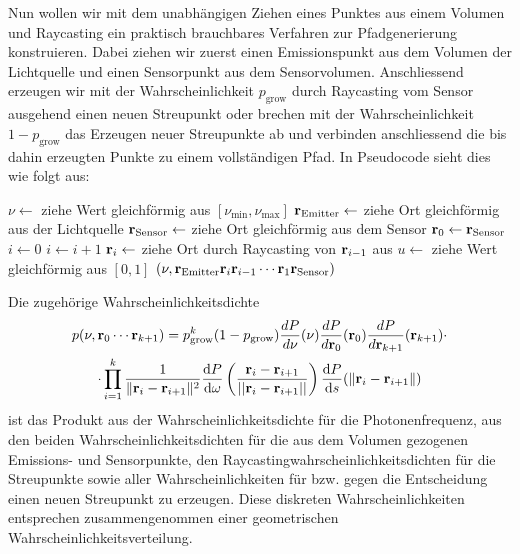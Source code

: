 	Nun wollen wir mit dem unabhängigen Ziehen eines Punktes aus einem Volumen und Raycasting ein praktisch brauchbares Verfahren zur Pfadgenerierung konstruieren. Dabei ziehen wir zuerst einen Emissionspunkt aus dem Volumen der Lichtquelle und einen Sensorpunkt aus dem Sensorvolumen. Anschliessend erzeugen wir mit der Wahrscheinlichkeit $p_\text{grow}$ durch Raycasting vom Sensor ausgehend einen neuen Streupunkt oder brechen mit der Wahrscheinlichkeit $1-p_\text{grow}$ das Erzeugen neuer Streupunkte ab und verbinden anschliessend die bis dahin erzeugten Punkte zu einem vollständigen Pfad. In Pseudocode sieht dies wie folgt aus:
	
	\begin{algorithmic}
		\STATE $\nu \leftarrow$ ziehe Wert gleichförmig aus $[\nu_\text{min},\nu_\text{max}]$
		\STATE $\mathbf{r}_\text{Emitter} \leftarrow$ ziehe Ort gleichförmig aus der Lichtquelle
		\STATE $\mathbf{r}_\text{Sensor} \leftarrow$ ziehe Ort gleichförmig aus dem Sensor
		\STATE $\mathbf{r}_0 \leftarrow \mathbf{r}_\text{Sensor}$
		\STATE $i \leftarrow 0$
		\REPEAT
			\STATE $i \leftarrow i+1$
			\STATE $\mathbf{r}_i \leftarrow$ ziehe Ort durch Raycasting von $\mathbf{r}_{i-1}$ aus
			\STATE $u \leftarrow$ ziehe Wert gleichförmig aus $[0,1]$
	  \RETURN $(\nu,\mathbf{r}_\text{Emitter}\mathbf{r}_i\mathbf{r}_{i-1}\cdots\mathbf{r}_1\mathbf{r}_\text{Sensor})$
	\end{algorithmic}
	
	Die zugehörige Wahrscheinlichkeitsdichte
	\begin{multline*}
		p(\nu,\mathbf{r}_0\cdots\mathbf{r}_{k+1})=p_\text{grow}^k(1-p_\text{grow})\frac{dP}{d\nu}(\nu)\frac{dP}{d\mathbf{r}_0}(\mathbf{r}_0)\frac{dP}{d\mathbf{r}_{k+1}}(\mathbf{r}_{k+1}) \cdot \\
	\cdot \prod_{i=1}^k \frac{1}{\|\mathbf{r}_i - \mathbf{r}_{i+1}\|^2} \frac{\text{d}P}{\text{d}\omega}\left(\frac{\mathbf{r}_i - \mathbf{r}_{i+1}}{||\mathbf{r}_i - \mathbf{r}_{i+1}||}\right) \frac{\text{d}P}{\text{d}s}(\|\mathbf{r}_i-\mathbf{r}_{i+1}\|)
	\end{multline*}
	ist das Produkt aus der Wahrscheinlichkeitsdichte für die Photonenfrequenz, aus den beiden Wahrscheinlichkeitsdichten für die aus dem Volumen gezogenen Emissions- und Sensorpunkte, den Ray\-casting\-wahr\-schein\-lich\-keits\-dich\-ten für die Streupunkte sowie aller Wahrscheinlichkeiten für bzw. gegen die Entscheidung einen neuen Streupunkt zu erzeugen. Diese diskreten Wahrscheinlichkeiten entsprechen zusammengenommen einer geometrischen Wahrscheinlichkeitsverteilung.
	
